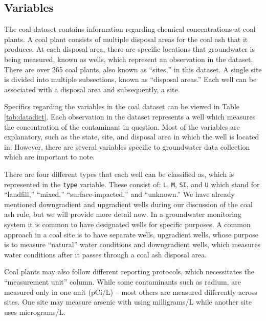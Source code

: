 \documentclass[12pt, twoside]{amherstthesis}
\begin{document}
\hypertarget{variables}{%
\subsection{Variables}\label{variables}}

The coal dataset contains information regarding chemical concentrations at coal plants. A coal plant consists of multiple disposal areas for the coal ash that it produces. At each disposal area, there are specific locations that groundwater is being measured, known as wells, which represent an observation in the dataset. There are over 265 coal plants, also known as ``sites,'' in this dataset. A single site is divided into multiple subsections, known as ``disposal areas.'' Each well can be associated with a disposal area and subsequently, a site.

Specifics regarding the variables in the coal dataset can be viewed in Table \ref{tab:datadict}. Each observation in the dataset represents a well which measures the concentration of the contaminant in question. Most of the variables are explanatory, such as the state, site, and disposal area in which the well is located in. However, there are several variables specific to groundwater data collection which are important to note.

There are four different types that each well can be classified as, which is represented in the \texttt{type} variable. These consist of: \texttt{L}, \texttt{M}, \texttt{SI}, and \texttt{U} which stand for ``landfill,'' ``mixed,'' ``surface-impacted,'' and ``unknown.'' We have already mentioned downgradient and upgradient wells during our discussion of the coal ash rule, but we will provide more detail now. In a groundwater monitoring system it is common to have designated wells for specific purposes. A common approach in a coal site is to have separate wells, upgradient wells, whose purpose is to measure ``natural'' water conditions and downgradient wells, which measures water conditions after it passes through a coal ash disposal area.

Coal plants may also follow different reporting protocols, which necessitates the ``measurement unit'' column. While some contaminants such as radium, are measured only in one unit (pCi/L) -- most others are measured differently across sites. One site may measure arsenic with using milligrams/L while another site uses micrograms/L.
\end{document}
